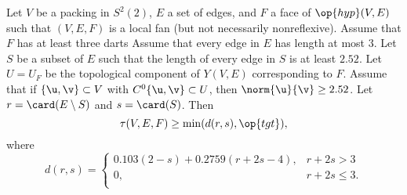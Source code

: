 \begin{theorem}\label{lemma:main-estimate-12}
  Let $V$ be a packing in $S^2(2)$, $E$ a set of edges, and $F$ a face
  of $\op{hyp}(V,E)$ such that $(V,E,F)$ is a local fan (but not
  necessarily nonreflexive).
  Assume that $F$ has at least three
  darts Assume that every edge in $E$ has length at most $3$.  Let
  $S$ be a subset of $E$ such that the length of every edge in $S$ is
  at least $2.52$.  Let $U=U_F$ be the topological component of
  $Y(V,E)$ corresponding to $F$.  Assume that if $\{\u,\v\}\subset V$
  with $C^0\{\u,\v\}\subset U$, then %
  $\norm{\u}{\v}\ge 2.52$.
  Let $r=\card(E\setminus S)$ and $s = \card(S)$.
Then
\[\tau(V,E,F) \ge \min(d(r,s),\op{tgt}),\]
where 
\[ d(r,s) = 
\begin{cases}
0.103 (2-s) + 0.2759 (r+2s-4), & r + 2s > 3\\
0, & r + 2s \le 3.\\
\end{cases}
\] 
\end{theorem}
%

